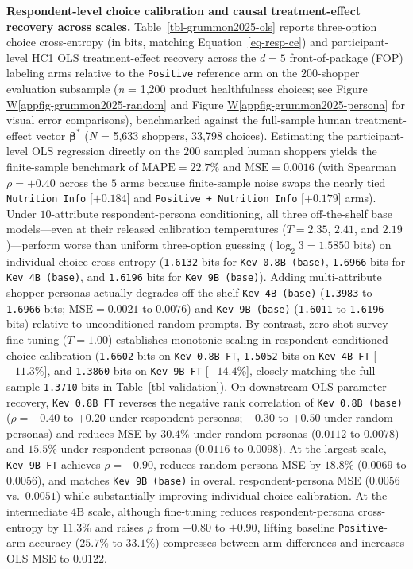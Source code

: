 \documentclass[
  letterpaper,
  DIV=11,
  numbers=noendperiod]{scrartcl}
\newcommand*\quartoappfigref[1]{Figure \hyperref[#1]{W\ref{#1}}}
\begin{document}
\textbf{Respondent-level choice calibration and causal treatment-effect
recovery across scales.} Table~\ref{tbl-grummon2025-ols} reports
three-option choice cross-entropy (in bits, matching
Equation~\ref{eq-resp-ce}) and participant-level HC1 OLS
treatment-effect recovery across the \(d = 5\) front-of-package (FOP)
labeling arms relative to the \texttt{Positive} reference arm on the
\(200\)-shopper evaluation subsample (\emph{n} = 1,200 product
healthfulness choices; see \quartoappfigref{appfig-grummon2025-random}
and \quartoappfigref{appfig-grummon2025-persona} for visual error
comparisons), benchmarked against the full-sample human treatment-effect
vector \(\boldsymbol{\beta}^*\) (\emph{N} = 5,633 shoppers, 33,798
choices). Estimating the participant-level OLS regression directly on
the \(200\) sampled human shoppers yields the finite-sample benchmark of
\(\mathrm{MAPE} = 22.7\%\) and \(\mathrm{MSE} = 0.0016\) (with Spearman
\(\rho = +0.40\) across the \(5\) arms because finite-sample noise swaps
the nearly tied \texttt{Nutrition\ Info} {[}\(+0.184\){]} and
\texttt{Positive\ +\ Nutrition\ Info} {[}\(+0.179\){]} arms). Under
\(10\)-attribute respondent-persona conditioning, all three
off-the-shelf base models---even at their released calibration
temperatures (\(T = 2.35\), \(2.41\), and \(2.19\))---perform worse than
uniform three-option guessing (\(\log_2 3 = 1.5850\) bits) on individual
choice cross-entropy (\texttt{1.6132} bits for
\texttt{Kev\ 0.8B\ (base)}, \texttt{1.6966} bits for
\texttt{Kev\ 4B\ (base)}, and \texttt{1.6196} bits for
\texttt{Kev\ 9B\ (base)}). Adding multi-attribute shopper personas
actually degrades off-the-shelf \texttt{Kev\ 4B\ (base)}
(\texttt{1.3983} to \texttt{1.6966} bits; \(\mathrm{MSE} = 0.0021\) to
\(0.0076\)) and \texttt{Kev\ 9B\ (base)} (\texttt{1.6011} to
\texttt{1.6196} bits) relative to unconditioned random prompts. By
contrast, zero-shot survey fine-tuning (\(T = 1.00\)) establishes
monotonic scaling in respondent-conditioned choice calibration
(\texttt{1.6602} bits on \texttt{Kev\ 0.8B\ FT}, \texttt{1.5052} bits on
\texttt{Kev\ 4B\ FT} {[}\(-11.3\%\){]}, and \texttt{1.3860} bits on
\texttt{Kev\ 9B\ FT} {[}\(-14.4\%\){]}, closely matching the full-sample
\texttt{1.3710} bits in Table~\ref{tbl-validation}). On downstream OLS
parameter recovery, \texttt{Kev\ 0.8B\ FT} reverses the negative rank
correlation of \texttt{Kev\ 0.8B\ (base)} (\(\rho = -0.40\) to \(+0.20\)
under respondent personas; \(-0.30\) to \(+0.50\) under random personas)
and reduces MSE by \(30.4\%\) under random personas (\(0.0112\) to
\(0.0078\)) and \(15.5\%\) under respondent personas (\(0.0116\) to
\(0.0098\)). At the largest scale, \texttt{Kev\ 9B\ FT} achieves
\(\rho = +0.90\), reduces random-persona MSE by \(18.8\%\) (\(0.0069\)
to \(0.0056\)), and matches \texttt{Kev\ 9B\ (base)} in overall
respondent-persona MSE (\(0.0056\) vs.~\(0.0051\)) while substantially
improving individual choice calibration. At the intermediate
\(4\text{B}\) scale, although fine-tuning reduces respondent-persona
cross-entropy by \(11.3\%\) and raises \(\rho\) from \(+0.80\) to
\(+0.90\), lifting baseline \texttt{Positive}-arm accuracy (\(25.7\%\)
to \(33.1\%\)) compresses between-arm differences and increases OLS MSE
to \(0.0122\).
\end{document}
